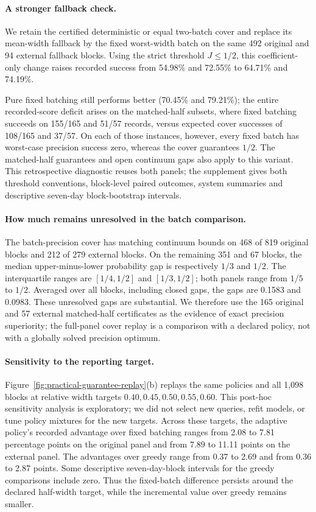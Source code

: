 \documentclass[12pt]{article}
\begin{document}
\paragraph{A stronger fallback check.}
We retain the certified deterministic or equal two-batch cover and replace its mean-width fallback by the fixed worst-width batch on the same 492 original and 94 external fallback blocks. Using the strict threshold $J\leq1/2$, this coefficient-only change raises recorded success from 54.98\% and 72.55\% to 64.71\% and 74.19\%.

Pure fixed batching still performs better (70.45\% and 79.21\%); the entire recorded-score deficit arises on the matched-half subsets, where fixed batching succeeds on 155/165 and 51/57 records, versus expected cover successes of 108/165 and 37/57. On each of those instances, however, every fixed batch has worst-case precision success zero, whereas the cover guarantees $1/2$. The matched-half guarantees and open continuum gaps also apply to this variant. This retrospective diagnostic reuses both panels; the supplement gives both threshold conventions, block-level paired outcomes, system summaries and descriptive seven-day block-bootstrap intervals.
\paragraph{How much remains unresolved in the batch comparison.}
The batch-precision cover has matching continuum bounds on 468 of 819 original
blocks and 212 of 279 external blocks. On the remaining 351 and 67 blocks,
the median upper-minus-lower probability gap is respectively $1/3$ and $1/2$.
The interquartile ranges are $[1/4,1/2]$ and $[1/3,1/2]$; both panels range
from $1/5$ to $1/2$. Averaged over all blocks, including closed gaps, the gaps
are 0.1583 and 0.0983. These unresolved gaps are substantial. We therefore
use the 165 original and 57 external matched-half certificates as the evidence
of exact precision superiority; the full-panel cover replay is a comparison
with a declared policy, not with a globally solved precision optimum.

\paragraph{Sensitivity to the reporting target.}
Figure~\ref{fig:practical-guarantee-replay}(b) replays the same policies and
all 1,098 blocks at relative width targets
$0.40,0.45,0.50,0.55,0.60$. This post-hoc sensitivity analysis is exploratory; we did
not select new queries, refit models, or tune policy mixtures for the new targets.
Across these targets, the adaptive policy's recorded advantage over fixed
batching ranges from 2.08 to 7.81 percentage points on the original panel and
from 7.89 to 11.11 points on the external panel. The advantages over greedy
range from 0.37 to 2.69 and from 0.36 to 2.87 points. Some descriptive
seven-day-block intervals for the greedy comparisons include zero. Thus the
fixed-batch difference persists around the declared half-width target, while
the incremental value over greedy remains smaller.
\end{document}
